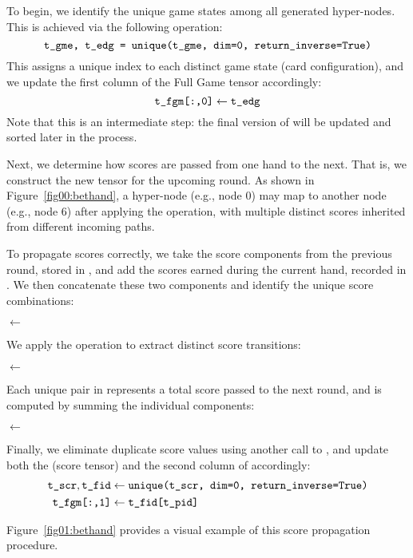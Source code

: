To begin, we identify the unique game states among all generated hyper-nodes. This is achieved via the following operation:
\[
\texttt{t\_gme, t\_edg = unique(t\_gme, dim=0, return\_inverse=True)}
\]
This assigns a unique index to each distinct game state (card configuration), and we update the first column of the Full Game tensor accordingly:
\[
\texttt{t\_fgm[:,0]} \leftarrow \texttt{t\_edg}
\]
Note that this is an intermediate step: the final version of  will be updated and sorted later in the process.

Next, we determine how scores are passed from one hand to the next. That is, we construct the new  tensor for the upcoming round. As shown in Figure~\ref{fig00:bethand}, a hyper-node (e.g., node 0) may map to another node (e.g., node 6) after applying the  operation, with multiple distinct scores inherited from different incoming paths.

To propagate scores correctly, we take the score components from the previous round, stored in , and add the scores earned during the current hand, recorded in . We then concatenate these two components and identify the unique score combinations:
\begin{center}
 $\gets$ 
\end{center}
We apply the  operation to extract distinct score transitions:
\begin{center}
 $\gets$ 
\end{center}
Each unique pair in  represents a total score passed to the next round, and is computed by summing the individual components:
\begin{center}
 $\gets$ 
\end{center}
Finally, we eliminate duplicate score values using another call to , and update both the  (score tensor) and the second column of  accordingly:
\begin{align*}
\texttt{t\_scr}, \texttt{t\_fid} &\gets \texttt{unique(t\_scr, dim=0, return\_inverse=True)} \\
\texttt{t\_fgm[:,1]} &\leftarrow \texttt{t\_fid[t\_pid]}
\end{align*}

Figure~\ref{fig01:bethand} provides a visual example of this score propagation procedure.

